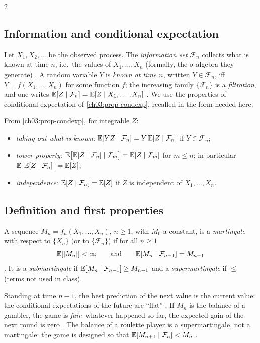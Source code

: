 \begin{paracol}{2}
\subsection{Information and conditional expectation}
Let $X_1,X_2,\dots$ be the observed process. The \emph{information set} $\mathcal F_n$ collects what is known at
time $n$, i.e.\ the values of $X_1,\dots,X_n$ (formally, the $\sigma$-algebra they generate) .
A random variable $Y$ is \emph{known at time $n$}, written $Y\in\mathcal F_n$, iff $Y=f(X_1,\dots,X_n)$ for
some function $f$; the increasing family $\{\mathcal F_n\}$ is a \emph{filtration}, and one writes
$\mathbb{E}[Z\mid\mathcal F_n]=\mathbb{E}[Z\mid X_1,\dots,X_n]$ . We use the properties of
conditional expectation of \cref{ch03:prop-condexp}, recalled \inmargin{} in the form needed here.
\begin{recall}
From \cref{ch03:prop-condexp}, for integrable $Z$:
\begin{itemize}
  \item \emph{taking out what is known}: $\mathbb{E}[YZ\mid\mathcal F_n]=Y\,\mathbb{E}[Z\mid\mathcal F_n]$ if $Y\in\mathcal F_n$;
  \item \emph{tower property}: $\mathbb{E}\bigl[\mathbb{E}[Z\mid\mathcal F_n]\mid\mathcal F_m\bigr]=\mathbb{E}[Z\mid\mathcal F_m]$ for
        $m\le n$; in particular $\mathbb{E}\bigl[\mathbb{E}[Z\mid\mathcal F_n]\bigr]=\mathbb{E}[Z]$;
  \item \emph{independence}: $\mathbb{E}[Z\mid\mathcal F_n]=\mathbb{E}[Z]$ if $Z$ is independent of $X_1,\dots,X_n$.
\end{itemize}
\end{recall}

\subsection{Definition and first properties}
\begin{definition}[Martingale]\label{ch04:def-mart}
A sequence $M_n=f_n(X_1,\dots,X_n)$, $n\ge1$, with $M_0$ a constant, is a \emph{martingale} with respect
to $\{X_n\}$ (or to $\{\mathcal F_n\}$) if for all $n\ge1$
\begin{equation}\label{ch04:eq-mart}
  \mathbb{E}[|M_n|]<\infty\qquad\text{and}\qquad \mathbb{E}[M_n\mid\mathcal F_{n-1}]=M_{n-1}
\end{equation}
. It is a \emph{submartingale} if $\mathbb{E}[M_n\mid\mathcal F_{n-1}]\ge M_{n-1}$ and a
\emph{supermartingale} if $\le$ (terms not used in class).
\end{definition}
Standing at time $n-1$, the best prediction of the next value is the current value: the conditional
expectations of the future are ``flat'' . If $M_n$ is the balance of a gambler, the game is
\emph{fair}: whatever happened so far, the expected gain of the next round is zero . The
balance of a roulette player is a supermartingale, not a martingale: the game is designed so that
$\mathbb{E}[M_{n+1}\mid\mathcal F_n]<M_n$ .


\end{paracol}
